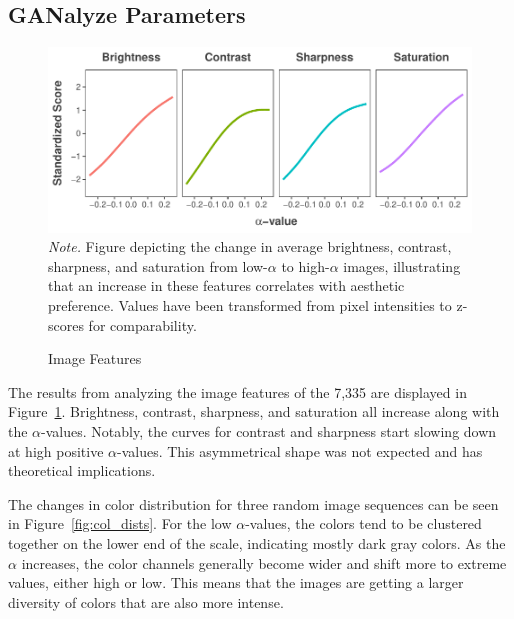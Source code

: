 \documentclass[../main.tex]{subfiles}
\begin{document}
\subsection{GANalyze Parameters}
\begin{figure}[!h]
	\caption{Image Features}
	\label{fig:img_features}
	\includegraphics[width=1\linewidth]{images/results/img_features.pdf}
	{\textit{Note.} Figure depicting the change in average brightness, contrast, sharpness, and saturation from low-$\alpha$ to high-$\alpha$ images, illustrating that an increase in these features correlates with aesthetic preference. Values have been transformed from pixel intensities to z-scores for comparability.}
\end{figure}

The results from analyzing the image features of the 7,335 are displayed in Figure~\ref{fig:img_features}. Brightness, contrast, sharpness, and saturation all increase along with the $\alpha$-values. Notably, the curves for contrast and sharpness start slowing down at high positive $\alpha$-values. This asymmetrical shape was not expected and has theoretical implications.



The changes in color distribution for three random image sequences can be seen in Figure~\ref{fig:col_dists}. For the low $\alpha$-values, the colors tend to be clustered together on the lower end of the scale, indicating mostly dark gray colors. As the $\alpha$ increases, the color channels generally become wider and shift more to extreme values, either high or low. This means that the images are getting a larger diversity of colors that are also more intense.
\end{document}
